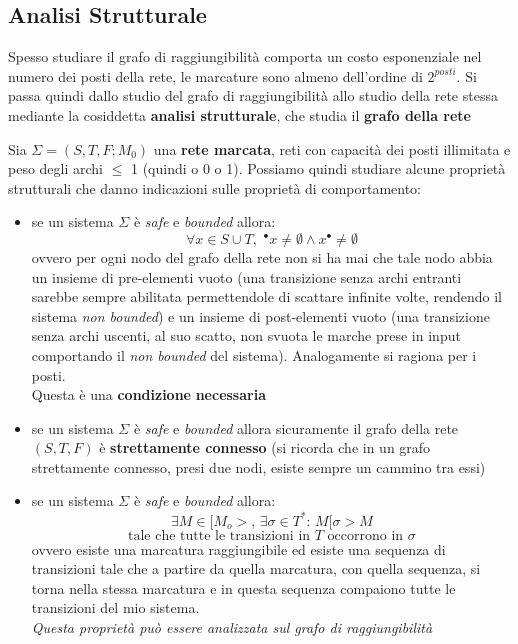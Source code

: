 \documentclass[a4paper,12pt, oneside]{book}
\begin{document}
\subsection{Analisi Strutturale}
Spesso studiare il grafo di raggiungibilità comporta un costo esponenziale nel
numero dei posti della rete, le marcature sono almeno dell'ordine di
$2^{posti}$. Si passa quindi dallo studio del grafo di raggiungibilità allo
studio della rete stessa mediante la cosiddetta \textbf{analisi strutturale},
che studia il \textbf{grafo della rete}
\begin{definizione}
  Sia $\Sigma=(S,T,F;M_0)$ una \textbf{rete marcata}, reti con capacità
  dei posti illimitata e peso degli archi $\leq$ 1 (quindi o 0 o 1). Possiamo
  quindi studiare alcune proprietà strutturali che danno indicazioni sulle
  proprietà di comportamento:
  \begin{itemize}
    \item se un sistema $\Sigma$ è \emph{safe} e \emph{bounded} allora:
    \[\forall x\in S\cup T,\,\,^\bullet x\neq \emptyset \wedge x^\bullet \neq
      \emptyset\]
    ovvero per ogni nodo del grafo della rete non si ha mai che tale nodo abbia
    un insieme di pre-elementi vuoto (una transizione senza archi entranti
    sarebbe sempre abilitata permettendole di scattare infinite volte, rendendo
    il sistema \emph{non bounded}) e un insieme di post-elementi vuoto (una
    transizione senza archi uscenti, al suo scatto, non svuota le marche prese
    in input comportando il \emph{non bounded} del sistema). Analogamente si
    ragiona per i posti.
    \\ Questa è una \textbf{condizione} \textbf{necessaria}
    \item se un sistema $\Sigma$ è \emph{safe} e \emph{bounded} allora
    sicuramente il grafo della rete $(S,T,F)$ è \textbf{strettamente connesso}
    (si ricorda che in un grafo strettamente connesso, presi due nodi, esiste
    sempre un cammino tra essi)
    \item se un sistema $\Sigma$ è \emph{safe} e \emph{bounded} allora:
    \[\exists M\in[M_o>, \,\exists \sigma \in T^*:\,M[\sigma>M\]
    \[\mbox{tale che tutte le transizioni in }T\mbox{ occorrono in }\sigma\]
    ovvero esiste una marcatura raggiungibile ed esiste una sequenza di
    transizioni tale che a partire da quella marcatura, con quella sequenza, si
    torna nella stessa marcatura e in questa sequenza compaiono tutte le
    transizioni del mio sistema.\\
    \emph{Questa proprietà può essere analizzata sul grafo di raggiungibilità
}
\end{itemize}
\end{definizione}
\end{document}
